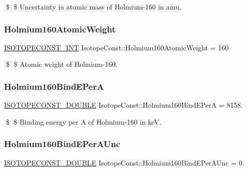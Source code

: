 \$ \$ Uncertainty in atomic mass of Holmium-\/160 in amu. \mbox{\label{group___isotope_const-_holmium-_ho160_ga25cf62511178aa88900d4cf37f0025a9}} 
\subsubsection{\texorpdfstring{Holmium160\+Atomic\+Weight}{Holmium160AtomicWeight}}
{\footnotesize\ttfamily \mbox{\hyperlink{group___isotope_const-_macros_ga5f18360b3e99483a35c32d789e62621c}{I\+S\+O\+T\+O\+P\+E\+C\+O\+N\+S\+T\+\_\+\+I\+NT}} Isotope\+Const\+::\+Holmium160\+Atomic\+Weight = 160}

\$ \$ Atomic weight of Holmium-\/160. \mbox{\label{group___isotope_const-_holmium-_ho160_ga52f37b177ce29986f1d279ac0cedb67a}} 
\subsubsection{\texorpdfstring{Holmium160\+Bind\+E\+PerA}{Holmium160BindEPerA}}
{\footnotesize\ttfamily \mbox{\hyperlink{group___isotope_const-_macros_ga8f45a7272ce02c0b4c65c44636ed719a}{I\+S\+O\+T\+O\+P\+E\+C\+O\+N\+S\+T\+\_\+\+D\+O\+U\+B\+LE}} Isotope\+Const\+::\+Holmium160\+Bind\+E\+PerA = 8158.}

\$ \$ Binding energy per A of Holmium-\/160 in keV. \mbox{\label{group___isotope_const-_holmium-_ho160_ga5945ce7b018eafd6d198dbcfd3601485}} 
\subsubsection{\texorpdfstring{Holmium160\+Bind\+E\+Per\+A\+Unc}{Holmium160BindEPerAUnc}}
{\footnotesize\ttfamily \mbox{\hyperlink{group___isotope_const-_macros_ga8f45a7272ce02c0b4c65c44636ed719a}{I\+S\+O\+T\+O\+P\+E\+C\+O\+N\+S\+T\+\_\+\+D\+O\+U\+B\+LE}} Isotope\+Const\+::\+Holmium160\+Bind\+E\+Per\+A\+Unc = 0.}

